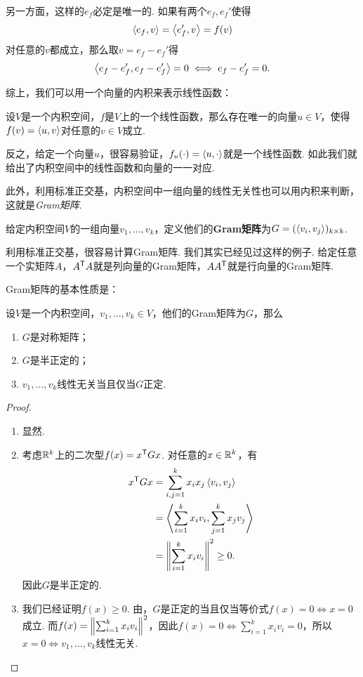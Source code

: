 另一方面，这样的$e_f$必定是唯一的. 如果有两个$e_f,e_f'$使得
\[\left\langle{e_f},{v}\right\rangle=\left\langle{e_f'},{v}\right\rangle=f(v)\]
对任意的$v$都成立，那么取$v=e_f-e_f'$得
\[\left\langle{e_f-e_f'},{e_f-e_f'}\right\rangle=0\iff e_f-e_f'=0.\]

综上，我们可以用一个向量的内积来表示线性函数：

\begin{theorem}[Riesz表示定理]\label{theorem:riesz}
设$V$是一个内积空间，$f$是$V$上的一个线性函数，那么存在唯一的向量$u\in V$，使得$f(v)=\left\langle{u},{v}\right\rangle$对任意的$v\in V$成立.
\end{theorem}

反之，给定一个向量$u$，很容易验证，$f_u(\cdot)=\left\langle{u},{\cdot}\right\rangle$就是一个线性函数. 如此我们就给出了内积空间中的线性函数和向量的一一对应. 

此外，利用标准正交基，内积空间中一组向量的线性无关性也可以用内积来判断，这就是\textit{Gram矩阵}. 

\begin{definition}[Gram矩阵]\label{definition:gram-matrix}
给定内积空间$V$的一组向量$v_1,\dots,v_k$，定义他们的\textbf{Gram矩阵}为$G=(\left\langle{v_i},{v_j}\right\rangle)_{k\times k}$. 
\end{definition}

利用标准正交基，很容易计算Gram矩阵. 我们其实已经见过这样的例子. 给定任意一个实矩阵$A$，$A^{\mathsf{T}} A$就是列向量的Gram矩阵，$AA^{\mathsf{T}}$就是行向量的Gram矩阵.

Gram矩阵的基本性质是：

\begin{proposition}\label{proposition:gram}
设$V$是一个内积空间，$v_1,\dots,v_k\in V$，他们的Gram矩阵为$G$，那么
\begin{enumerate}
    \item $G$是对称矩阵；
    \item $G$是半正定的；
    \item $v_1,\dots,v_k$线性无关当且仅当$G$正定.
\end{enumerate}
\end{proposition}
\begin{proof}
\begin{enumerate}
    \item 显然.
    \item 考虑$\mathbb{R}^k$上的二次型$f(x)=x^{\mathsf{T}} Gx$. 对任意的$x\in\mathbb{R}^k$，有
    \begin{align*}
        x^{\mathsf{T}} G x&=\sum_{i,j=1}^kx_ix_j\left\langle{v_i},{v_j}\right\rangle\\
        &=\left\langle{\sum_{i=1}^kx_iv_i},{\sum_{j=1}^kx_jv_j}\right\rangle\\
        &=\left\|\sum_{i=1}^kx_iv_i\right\|^2\geq 0.
    \end{align*}
    因此$G$是半正定的.
    \item 我们已经证明$f(x)\geq 0$. 由，$G$是正定的当且仅当等价式$f(x)=0\iff x=0$成立. 而$f(x)=\left\|\sum_{i=1}^kx_iv_i\right\|^2$，因此$f(x)=0\iff \sum_{i=1}^kx_iv_i=0$，所以$x=0\iff v_1,\dots,v_k$线性无关.
\end{enumerate}
\end{proof}

